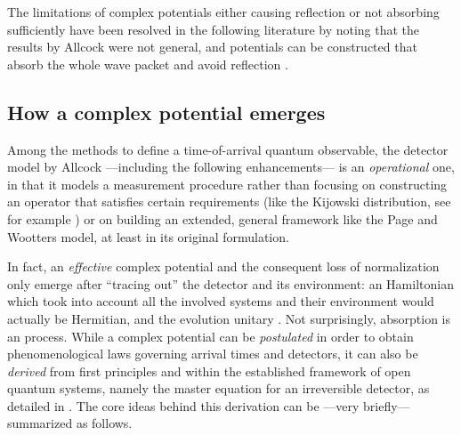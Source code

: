 The limitations of complex potentials either causing reflection
or not absorbing sufficiently have been resolved
in the following literature
by noting that the results by Allcock were not general, and
potentials can be constructed that absorb the whole wave packet
and avoid reflection \parencite{Muga_TOAQM, Muga_CompositeAbsPot, ComplexAbsPot}.

\subsection{How a complex potential emerges}

Among the methods to define a time-of-arrival quantum observable,
the detector model by Allcock
---including the following enhancements---
is an \emph{operational} one,
in that it models a measurement procedure \parencite[\S 9]{Leavens_TOA}
rather than focusing on constructing an operator that satisfies certain requirements
(like the Kijowski distribution, see for example \cite[\S 8]{Leavens_TOA})
or on building an extended, general framework
like the Page and Wootters model, at least in its original formulation.

\citereset
In fact, an \emph{effective} complex potential and the consequent loss of normalization
only emerge after ``tracing out'' the detector and its environment:
an Hamiltonian which took into account all the involved systems and their environment
would actually be Hermitian, and the evolution unitary \parencite[\S 9]{Leavens_TOA}.
Not surprisingly, absorption is an  process.
While a complex potential can be \emph{postulated} in order to obtain
phenomenological laws governing arrival times and detectors,
it can also be \emph{derived} from first principles and within the established framework
of open quantum systems, namely the master equation
for an irreversible detector, as detailed in \cite{Halliwell_Irreversible}.
The core ideas behind this derivation
can be ---very briefly--- summarized as follows.

